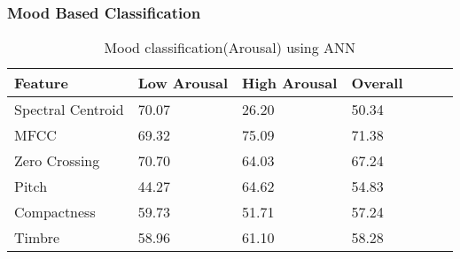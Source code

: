 \newpage
\subsubsection{Mood Based Classification}

\begin{table}[h!]
        \caption{Mood classification(Arousal) using ANN}
        \begin{center}
                \begin{tabular}{|l|l|l|l|l|l|l|}
                        \hline
                        Feature
                        &
                        Low Arousal
                        &
                        High Arousal
                        &
                        Overall
                        \\\hline

                        Spectral Centroid
                        &
                        70.07
                        &
                        26.20
                        &
                        50.34
                        \\\hline
                        MFCC
                        &
                        69.32
                        &
                        75.09
                        &
                        71.38
                        \\\hline

                        Zero Crossing
                        &
                        70.70
                        &
                        64.03
                        &
                        67.24
                        \\\hline

                        Pitch
                        &
                        44.27
                        &
                        64.62
                        &
                        54.83
                        \\\hline

                        Compactness
                        &
                        59.73
                        &
                        51.71
                        &
                        57.24
                \\\hline

                Timbre
                &
                58.96
                &
                61.10
                &
                58.28
                \\\hline
                

\end{tabular}
\end{center}
\end{table}
